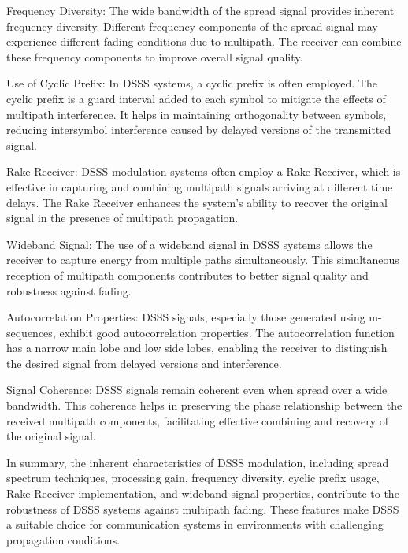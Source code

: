 Frequency Diversity:
The wide bandwidth of the spread signal provides inherent frequency diversity. Different frequency components of the spread signal may experience different fading conditions due to multipath. The receiver can combine these frequency components to improve overall signal quality.

Use of Cyclic Prefix:
In DSSS systems, a cyclic prefix is often employed. The cyclic prefix is a guard interval added to each symbol to mitigate the effects of multipath interference. It helps in maintaining orthogonality between symbols, reducing intersymbol interference caused by delayed versions of the transmitted signal.

Rake Receiver:
DSSS modulation systems often employ a Rake Receiver, which is effective in capturing and combining multipath signals arriving at different time delays. The Rake Receiver enhances the system's ability to recover the original signal in the presence of multipath propagation.

Wideband Signal:
The use of a wideband signal in DSSS systems allows the receiver to capture energy from multiple paths simultaneously. This simultaneous reception of multipath components contributes to better signal quality and robustness against fading.

Autocorrelation Properties:
DSSS signals, especially those generated using m-sequences, exhibit good autocorrelation properties. The autocorrelation function has a narrow main lobe and low side lobes, enabling the receiver to distinguish the desired signal from delayed versions and interference.

Signal Coherence:
DSSS signals remain coherent even when spread over a wide bandwidth. This coherence helps in preserving the phase relationship between the received multipath components, facilitating effective combining and recovery of the original signal.

In summary, the inherent characteristics of DSSS modulation, including spread spectrum techniques, processing gain, frequency diversity, cyclic prefix usage, Rake Receiver implementation, and wideband signal properties, contribute to the robustness of DSSS systems against multipath fading. These features make DSSS a suitable choice for communication systems in environments with challenging propagation conditions.
